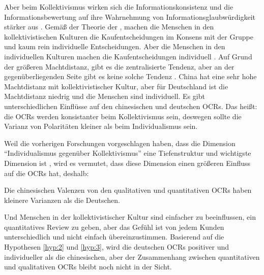 Aber beim Kollektivismus wirken sich die Informationskonsistenz und die Informationsbewertung auf ihre Wahrnehmung von Informationsglaubwürdigkeit stärker aus \citep{Luo2014}. Gemäß der Theorie der \citet{hofstede1998masculinity}, machen die Menschen in den kollektivistischen Kulturen die Kaufentscheidungen im Konsens mit der Gruppe und kaum rein individuelle Entscheidungen. Aber die Menschen in den individuellen Kulturen machen die Kaufentscheidungen individuell \citep{singelis1994measurement}. Auf Grund der größeren Machtdistanz, gibt es die zentralisierte Tendenz, aber an der gegenüberliegenden Seite gibt es keine solche Tendenz \citep{hofstede2013interkulturelle}. China hat eine sehr hohe Machtdistanz mit kollektivistischer Kultur, aber für Deutschland ist die Machtdistanz niedrig und die Menschen sind individuell. Es gibt unterschiedlichen Einflüsse auf den chinesischen und deutschen \ac{OCRs}. Das heißt: die \ac{OCRs} werden konsistanter beim Kollektivismus sein, deswegen sollte die Varianz von Polaritäten kleiner als beim Individualismus sein.

Weil die vorherigen Forschungen vorgeschlagen haben, dass die Dimension ``Individualismus gegenüber Kollektivismus'' eine Tiefenstruktur und wichtigste Dimension ist \citep{grennfield2000approaches,sia2009web, triandis2001individualism}, wird es vermutet, dass diese Dimension einen größeren Einfluss auf die \ac{OCRs} hat, deshalb:
\begin{hyp} 
Die chinesischen Valenzen von den qualitativen und quantitativen \acl{OCRs} haben kleinere Varianzen als die Deutschen.
\label{hyp:3}
\end{hyp}


Und Menschen in der kollektivistischer Kultur sind einfacher zu beeinflussen, ein quantitatives Review zu geben, aber das Gefühl ist von jedem Kunden unterschiedlich und nicht einfach übereinzustimmen. Basierend auf die Hypothesen \ref{hyp:2} und \ref{hyp:3}, wird die deutschen \ac{OCRs} positiver und individueller als die chinesischen, aber der Zusammenhang zwischen quantitativen und qualitativen \ac{OCRs} bleibt noch nicht in der Sicht. 

